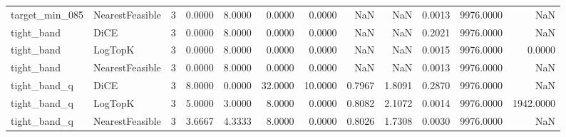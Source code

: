 \begin{tabular}{llrrrrrrrrrr}
      target\_min\_085 & NearestFeasible &      3 &            0.0000 &          8.0000 &          0.0000 &        0.0000 &                NaN &            NaN &       0.0013 &          9976.0000 &                   NaN \\
          tight\_band &            DiCE &      3 &            0.0000 &          8.0000 &          0.0000 &        0.0000 &                NaN &            NaN &       0.2021 &          9976.0000 &                   NaN \\
          tight\_band &         LogTopK &      3 &            0.0000 &          8.0000 &          0.0000 &        0.0000 &                NaN &            NaN &       0.0015 &          9976.0000 &                0.0000 \\
          tight\_band & NearestFeasible &      3 &            0.0000 &          8.0000 &          0.0000 &        0.0000 &                NaN &            NaN &       0.0013 &          9976.0000 &                   NaN \\
        tight\_band\_q &            DiCE &      3 &            8.0000 &          0.0000 &         32.0000 &       10.0000 &             0.7967 &         1.8091 &       0.2870 &          9976.0000 &                   NaN \\
        tight\_band\_q &         LogTopK &      3 &            5.0000 &          3.0000 &          8.0000 &        0.0000 &             0.8082 &         2.1072 &       0.0014 &          9976.0000 &             1942.0000 \\
        tight\_band\_q & NearestFeasible &      3 &            3.6667 &          4.3333 &          8.0000 &        0.0000 &             0.8026 &         1.7308 &       0.0030 &          9976.0000 &                   NaN \\
\bottomrule
\end{tabular}
